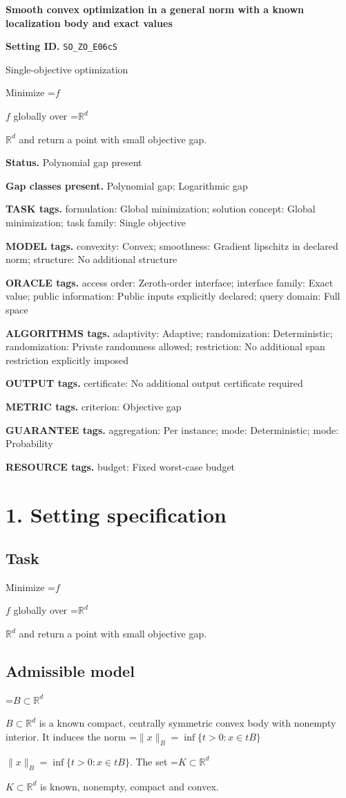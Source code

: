 \documentclass[10pt,a4paper]{article}
\newcommand{\AtlasMath}[1]{\par\begingroup\centering\setbox0=\hbox{$\displaystyle #1$}\ifdim\wd0>1.4\linewidth\typeout{ATLAS WIDE FORMULA: \the\wd0}\fi\ifdim\wd0>\linewidth\resizebox{\linewidth}{!}{\box0}\else\box0\fi\par\endgroup}
\newcommand{\AtlasInlineMath}[1]{\begingroup\setbox0=\hbox{$#1$}\ifdim\wd0>.4\linewidth\endgroup\AtlasMath{#1}\else\endgroup$#1$\fi}
\begin{document}
\raggedright

{\LARGE\bfseries\sffamily\color{AtlasNavy} Smooth convex optimization in a general norm with a known localization body and exact values\par}\vspace{5pt}
\textbf{Setting ID.} \texttt{SO\_\allowbreak{}ZO\_\allowbreak{}E06cS}

Single-objective optimization

Minimize \AtlasInlineMath{f} globally over \AtlasInlineMath{\mathbb{R}^d} and return a point with small objective gap.

\textbf{Status.} Polynomial gap present

\textbf{Gap classes present.} Polynomial gap; Logarithmic gap

\textbf{TASK tags.} formulation: Global minimization; solution concept: Global minimization; task family: Single objective

\textbf{MODEL tags.} convexity: Convex; smoothness: Gradient lipschitz in declared norm; structure: No additional structure

\textbf{ORACLE tags.} access order: Zeroth-order interface; interface family: Exact value; public information: Public inputs explicitly declared; query domain: Full space

\textbf{ALGORITHMS tags.} adaptivity: Adaptive; randomization: Deterministic; randomization: Private randomness allowed; restriction: No additional span restriction explicitly imposed

\textbf{OUTPUT tags.} certificate: No additional output certificate required

\textbf{METRIC tags.} criterion: Objective gap

\textbf{GUARANTEE tags.} aggregation: Per instance; mode: Deterministic; mode: Probability

\textbf{RESOURCE tags.} budget: Fixed worst-case budget

\section{1. Setting specification}
\subsection{Task}
Minimize \AtlasInlineMath{f} globally over \AtlasInlineMath{\mathbb{R}^d} and return a point with small objective gap.

\subsection{Admissible model}
\AtlasInlineMath{B\subset\mathbb{R}^d} is a known compact, centrally symmetric convex body with nonempty interior. It induces the norm \AtlasInlineMath{\|x\|_B=\inf\{t>0:x\in tB\}}. The set \AtlasInlineMath{K\subset\mathbb{R}^d} is known, nonempty, compact and convex.
\end{document}
